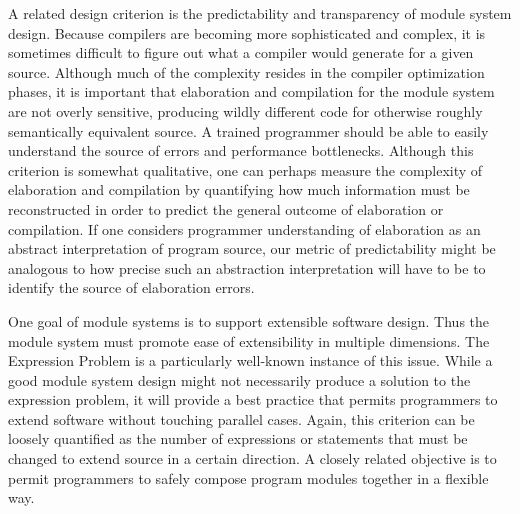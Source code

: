 \documentclass[12pt]{article}
\begin{document}
A related design criterion is the predictability and transparency of module system design. Because compilers are becoming more sophisticated and complex, it is sometimes difficult to figure out what a compiler would generate for a given source. Although much of the complexity resides in the compiler optimization phases, it is important that elaboration and compilation for the module system are not overly sensitive, producing wildly different code for otherwise roughly semantically equivalent source. A trained programmer should be able to easily understand the source of errors and performance bottlenecks. Although this criterion is somewhat qualitative, one can perhaps measure the complexity of elaboration and compilation by quantifying how much information must be reconstructed in order to predict the general outcome of elaboration or compilation. If one considers programmer understanding of elaboration as an abstract interpretation of program source, our metric of predictability might be analogous to how precise such an abstraction interpretation will have to be to identify the source of elaboration errors. 

One goal of module systems is to support extensible software design. Thus the module system must promote ease of extensibility in multiple dimensions. The Expression Problem is a particularly well-known instance of this issue\cite{exprprob}. While a good module system design might not necessarily produce a solution to the expression problem, it will provide a best practice that permits programmers to extend software without touching parallel cases. Again, this criterion can be loosely quantified as the number of expressions or statements that must be changed to extend source in a certain direction. A closely related objective is to permit programmers to safely compose program modules together in a flexible way. 
\end{document}

